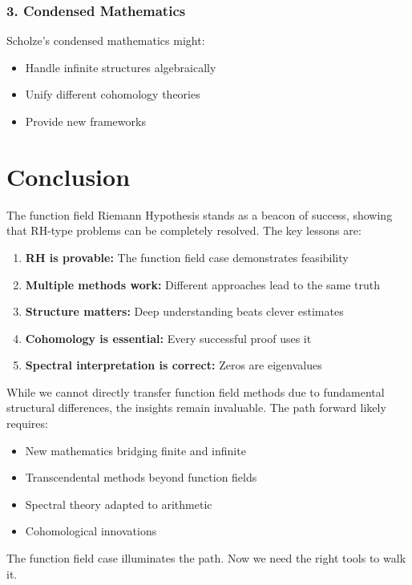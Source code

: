 \subsubsection{3. Condensed Mathematics}

Scholze's condensed mathematics might:
\begin{itemize}
\item Handle infinite structures algebraically
\item Unify different cohomology theories
\item Provide new frameworks
\end{itemize}

\section{Conclusion}

The function field Riemann Hypothesis stands as a beacon of success, showing that RH-type problems can be completely resolved. The key lessons are:

\begin{enumerate}
\item \textbf{RH is provable:} The function field case demonstrates feasibility
\item \textbf{Multiple methods work:} Different approaches lead to the same truth
\item \textbf{Structure matters:} Deep understanding beats clever estimates
\item \textbf{Cohomology is essential:} Every successful proof uses it
\item \textbf{Spectral interpretation is correct:} Zeros are eigenvalues
\end{enumerate}

While we cannot directly transfer function field methods due to fundamental structural differences, the insights remain invaluable. The path forward likely requires:
\begin{itemize}
\item New mathematics bridging finite and infinite
\item Transcendental methods beyond function fields
\item Spectral theory adapted to arithmetic
\item Cohomological innovations
\end{itemize}

The function field case illuminates the path. Now we need the right tools to walk it.

